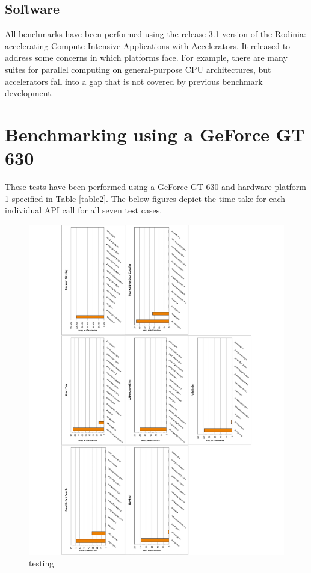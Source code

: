 \documentclass[paper=a4, fontsize=11pt]{scrartcl}
\numberwithin{equation}{section}		%
\numberwithin{figure}{section}			%
\numberwithin{table}{section}				%
\begin{document}
\subsection{Software}
All benchmarks have been performed using the release 3.1 version of the Rodinia: accelerating Compute-Intensive Applications with Accelerators. It released to address some concerns in  which platforms face. For example, there are many suites for parallel computing on general-purpose CPU architectures, but accelerators fall into a gap that is not covered by previous benchmark development.



\newpage
\section{Benchmarking using a GeForce GT 630}
These tests have been performed using a GeForce GT 630 and hardware platform 1 specified in Table \ref{table2}. The below figures depict the time take for each individual API call for all seven test cases.

\begin{figure}[!h]
\centering
\includegraphics[scale=0.6]{../imgs/x630.pdf}
\caption{testing}
\label{??}
\end{figure}
\end{document}
